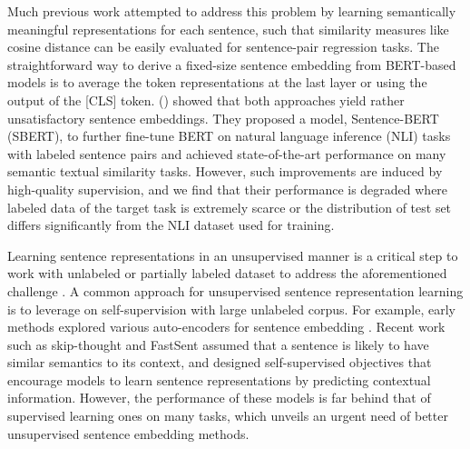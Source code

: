 \documentclass[11pt,a4paper]{article}
\begin{document}
Much previous work attempted to address this problem by learning semantically meaningful representations for each sentence, such that similarity measures like cosine distance can be easily evaluated for sentence-pair regression tasks. The straightforward way to derive a fixed-size sentence embedding from BERT-based models is to average the token representations at the last layer or using the output of the [CLS] token. \citeauthor{reimers2019} (\citeyear{reimers2019}) showed that both approaches yield rather unsatisfactory sentence embeddings. They proposed a model, Sentence-BERT (SBERT), to further fine-tune BERT on natural language inference (NLI) tasks with labeled sentence pairs and achieved state-of-the-art performance on many semantic textual similarity tasks. However, such improvements are induced by high-quality supervision, 
and we find that their performance is degraded where labeled data of the target task is extremely scarce or the distribution of test set differs significantly from the NLI dataset used for training. 

Learning sentence representations in an unsupervised manner is a critical step to work with unlabeled or partially labeled dataset to address the aforementioned challenge \cite{Kiros2015,gan2017,hill2016,pagliardini2017unsupervised,Yang2018LearningST}. A common approach for unsupervised sentence representation learning is to leverage on self-supervision with large unlabeled corpus. For example, early methods explored various auto-encoders for sentence embedding \cite{Socher2011,hill2016}. Recent work such as skip-thought \cite{Kiros2015} and FastSent \cite{hill2016} assumed that a sentence is likely to have similar semantics to its context, and designed self-supervised objectives that encourage models to learn sentence representations by predicting contextual information. However, the performance of these models is far behind that of supervised learning ones on many tasks, which unveils an urgent need of better unsupervised sentence embedding methods. 
\end{document}
